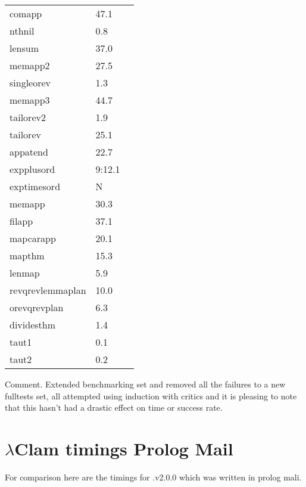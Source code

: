 \begin{center}
\begin{supertabular}[t]{llp{2in}}
comapp & 47.1 & \\
nthnil & 0.8 & \\
lensum & 37.0 & \\
memapp2 & 27.5 & \\
singleorev & 1.3 & \\
memapp3 & 44.7 & \\
tailorev2 & 1.9 & \\
tailorev & 25.1 & \\
appatend & 22.7 & \\
expplusord & 9:12.1 & \\
exptimesord & N & \\
memapp & 30.3 & \\
filapp & 37.1 & \\
mapcarapp & 20.1 & \\
mapthm & 15.3 & \\
lenmap & 5.9 & \\
revqrevlemmaplan & 10.0 & \\
orevqrevplan & 6.3 & \\
dividesthm & 1.4 & \\
taut1 & 0.1 & \\
taut2 & 0.2 & \\
\end{supertabular}\end{center}

Comment.  Extended benchmarking set and removed all the failures to a new fulltests set, all attempted using induction with critics and it is pleasing to note that this hasn't had a drastic effect on time or success rate.




\section{$\lambda$Clam timings Prolog Mail}
For comparison here are the timings for \lclam.v2.0.0 which was
written in prolog mali. 

